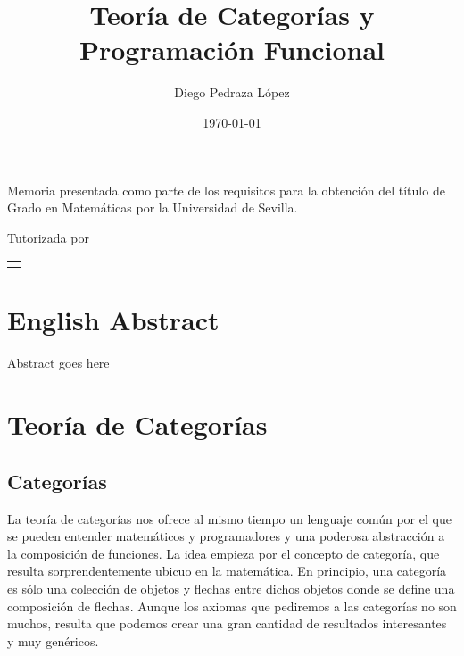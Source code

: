 \documentclass[12pt, twoside]{book}
\title{Teoría de Categorías y Programación Funcional}
\author{Diego Pedraza López}
\date{\today}
\makeatletter
\renewcommand\maketitle{%
  \begin{titlepage}
      \vspace*{1.5cm}
      \parskip=0pt
      \Huge\bfseries
      \begin{center}
          \@title
      \end{center}
      \vspace{1cm}
      \begin{center}
          \@author
      \end{center}
  \end{titlepage}

  \begin{titlepage}
  \parindent=0pt
  \begin{flushleft}
  \vspace*{1.5mm}
  \setlength\baselineskip{0pt}
  \setlength\parskip{0mm}
  \begin{center}
  \end{center}
  \end{flushleft}
  \vspace{1cm}
  \bgroup
  \Large \bfseries
  \begin{center}
  \@title
  \end{center}
  \egroup
  \vspace*{.5cm}
  \begin{center}
  \@author
  \end{center}
  \vspace*{1.8cm}
  \begin{flushright}
  \begin{minipage}{8.45cm}
      Memoria presentada como parte de los requisitos para la obtención del título de
      Grado en Matemáticas por la Universidad de Sevilla.

      \vspace*{7.5mm}

      Tutorizada por
  \end{minipage}\par
  \begin{tabularx}{8.45cm}[b]{@{}l}
      \guardatutores
  \end{tabularx}
   \end{flushright}
      \vspace*{\fill}
   \end{titlepage}
   \pagestyle{tfg}
   \renewcommand{\chaptermark}[1]{\markright{\thechapter.\space ##1}}
   \renewcommand{\sectionmark}[1]{}
   \renewcommand{\subsectionmark}[1]{}
  }
\makeatother
\begin{document}
\maketitle

\frontmatter
\tableofcontents

\mainmatter


\chapter*{English Abstract}

\begin{otherlanguage}{english}
    Abstract goes here
\end{otherlanguage}


\chapter{Teoría de Categorías}

\section{Categorías}

La teoría de categorías nos ofrece al mismo tiempo un lenguaje común por el que se pueden entender matemáticos y programadores y una poderosa abstracción a la composición de funciones.
La idea empieza por el concepto de categoría, que resulta sorprendentemente ubicuo en la matemática.
En principio, una categoría es sólo una colección de objetos y flechas entre dichos objetos donde se define una composición de flechas.
Aunque los axiomas que pediremos a las categorías no son muchos, resulta que podemos crear una gran cantidad de resultados interesantes y muy genéricos.
\end{document}
